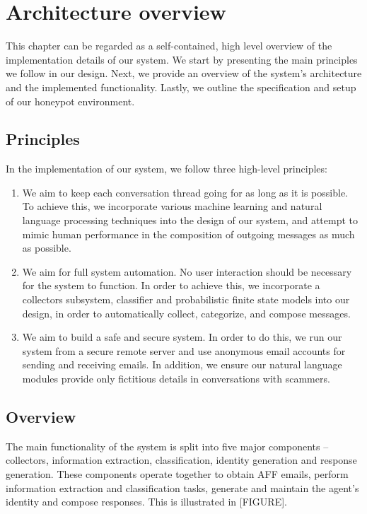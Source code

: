 \chapter{Architecture overview}
This chapter can be regarded as a self-contained, high level overview of the implementation details of our system. We start by presenting the main principles we follow in our design. Next, we provide an overview of the system's architecture and the implemented functionality. Lastly, we outline the specification and setup of our honeypot environment.

\section{Principles}
In the implementation of our system, we follow three high-level principles:

\begin{enumerate}
\item We aim to keep each conversation thread going for as long as it is possible. To achieve this, we incorporate various machine learning and natural language processing techniques into the design of our system, and attempt to mimic human performance in the composition of outgoing messages as much as possible.
\item We aim for full system automation. No user interaction should be necessary for the system to function. In order to achieve this, we incorporate a collectors subsystem, classifier and probabilistic finite state models into our design, in order to automatically collect, categorize, and compose messages.
\item We aim to build a safe and secure system. In order to do this, we run our system from a secure remote server and use anonymous email accounts for sending and receiving emails. In addition, we ensure our natural language modules provide only fictitious details in conversations with scammers.
\end{enumerate}

\section{Overview}
The main functionality of the system is split into five major components – collectors, information extraction, classification, identity generation and response generation. These components operate together to obtain AFF emails, perform information extraction and classification tasks, generate and maintain the agent's identity and compose responses. This is illustrated in [FIGURE].

